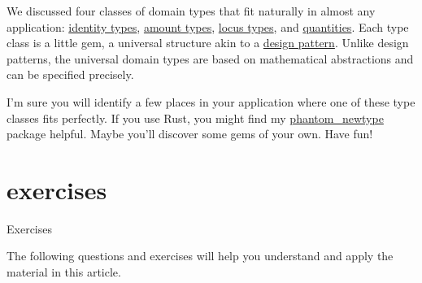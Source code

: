 \documentclass{article}
\begin{document}
We discussed four classes of domain types that fit naturally in almost any application: \href{#identity-types}{identity types}, \href{#amount-types}{amount types}, \href{#locus-types}{locus types}, and \href{#quantities}{quantities}.
Each type class is a little gem, a universal structure akin to a \href{https://en.wikipedia.org/wiki/Software_design_pattern}{design pattern}.
Unlike design patterns, the universal domain types are based on mathematical abstractions and can be specified precisely.

I'm sure you will identify a few places in your application where one of these type classes fits perfectly.
If you use Rust, you might find my \href{https://crates.io/crates/phantom_newtype}{phantom\_newtype} package helpful.
Maybe you'll discover some gems of your own.
Have fun!

\section{exercises}{Exercises}

The following questions and exercises will help you understand and apply the material in this article.

\end{document}
